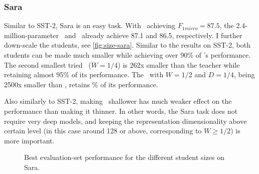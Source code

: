 {{    \subsubsection{Sara}{
      Similar to SST-2, Sara is an easy task. With \BERTT~achieving $F_{1 micro}=87.5$, the 2.4-million-parameter \BERTS~and \LSTMS~already achieve 87.1 and 86.5, respectively.
      I further down-scale the students, see \autoref{fig:size-sara}. Similar to the results on SST-2, both students can be made much smaller while achieving over 90\% of \BERTT's performance.
      The second smallest tried \LSTMS~($W=1/4$) is 262x smaller than the teacher while retaining almost 95\% of its performance.
      The \BERTS~with $W=1/2$ and $D=1/4$, being 2500x smaller than \BERTT, retains \% of its performance.

      Also similarly to SST-2, making \BERTS~shallower has much weaker effect on the performance than making it thinner. In other words, the Sara task does not require very deep models, and keeping the representation dimensionality above certain level (in this case around 128 or above, corresponding to $W\geq1/2$) is more important.
      \begin{figure}
      \caption{Best evaluation-set performance for the different student sizes on Sara.}
      \label{fig:size-sara}
      \end{figure}
    }
  }
}

